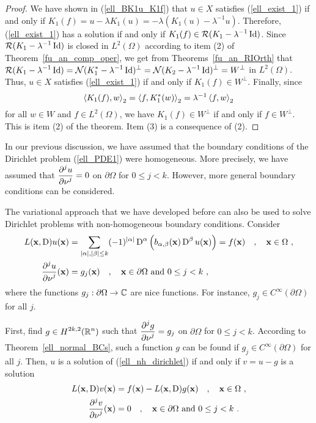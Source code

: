\begin{proof}
We have shown in (\ref{ell_BK1u_K1f}) that $u\in X$ satisfies
(\ref{ell_exist_1}) if and
only if $\displaystyle K_1(f) = u - \lambda K_1(u)
= -\lambda ( K_1(u) - \lambda^{-1} u)$.
Therefore, (\ref{ell_exist_1}) has a solution if and only if
$\displaystyle K_1(f) \in \mathcal{R}(K_1 - \lambda^{-1}\operatorname{Id})$.  Since
$\displaystyle \mathcal{R}(K_1 -\lambda^{-1}\operatorname{Id})$ is closed in
$\displaystyle L^2(\Omega)$ according to
item (2) of Theorem~\ref{fu_an_comp_oper}, we get
from Theorems~\ref{fu_an_RIOrth} that
$\displaystyle \mathcal{R}(K_1-\lambda^{-1}\operatorname{Id}) = \mathcal{N}(K_1^\ast-\lambda^{-1}\operatorname{Id})^\perp
= \mathcal{N}(K_2-\lambda^{-1}\operatorname{Id})^\perp = W^\perp$ in
$\displaystyle L^2(\Omega)$.  Thus, $u\in X$ satisfies
(\ref{ell_exist_1}) if and only if $K_1(f) \in W^\perp$.  Finally,
since
\[
\left\langle{K_1(f)} , {w}\right\rangle_2 = \left\langle{f} , {K_1^\ast(w)}\right\rangle_2 = \lambda^{-1} \left\langle{f} , {w}\right\rangle_2
\]
for all $w \in W$ and $\displaystyle f \in L^2(\Omega)$,
we have $\displaystyle K_1(f) \in W^\perp$ if and only if
$\displaystyle f\in W^\perp$.  This is
item (2) of the theorem.  Item (3) is a consequence of (2).
\end{proof}

\begin{rmk}
In our previous discussion, we have assumed that the boundary
conditions of the Dirichlet problem (\ref{ell_PDE1}) were homogeneous.
More precisely, we have assumed that
$\displaystyle \frac{\displaystyle \partial^{j}{u}} {\displaystyle \partial \mathbf{\nu}^{j}} = 0$ on
$\partial \Omega$ for $0 \leq j < k$.  However, more
general boundary conditions can be considered.   \label{ellRmkNhom}

The variational approach that we have developed before can also be
used to solve Dirichlet problems with non-homogeneous boundary
conditions.  Consider
\begin{equation} \label{ell_nh_dirichlet}
\begin{split}
L(\mathbf{x}, \operatorname{D})u(\mathbf{x})
&= \sum_{|\alpha|,|\beta|\leq k} (-1)^{|\alpha|} \operatorname{D}^\alpha
\left( b_{\alpha,\beta}(\mathbf{x}) \operatorname{D}^\beta u(\mathbf{x})\right) = f(\mathbf{x}) \quad
, \quad \mathbf{x} \in \Omega \ ,\\
\frac{\displaystyle \partial^{j}{u}} {\displaystyle \partial \mathbf{\nu}^{j}}(\mathbf{x}) &= g_j(\mathbf{x}) \quad , \quad
\mathbf{x} \in \partial \Omega \ \text{and}\ 0 \leq j < k \ ,
\end{split}
\end{equation}
where the functions $g_j:\partial \Omega \rightarrow \mathbb{C}$ are nice
functions.  For instance, $g_j \in C^\infty(\partial \Omega)$ for all $j$.

First, find $\displaystyle g\in H^{2k,2}(\mathbb{R}^n)$ such that
$\displaystyle \frac{\displaystyle \partial^{j}{g}} {\displaystyle \partial \mathbf{\nu}^{j}} = g_j$ on $\partial \Omega$ for
$0 \leq j < k$.  According to Theorem~\ref{ell_normal_BCs}, such a
function $g$ can be found if
$\displaystyle g_j \in C^\infty(\partial \Omega)$ for
all $j$.  Then, $u$ is a solution of (\ref{ell_nh_dirichlet}) if and
only if $v=u-g$ is a solution
\begin{align*}
L(\mathbf{x}, \operatorname{D})v(\mathbf{x}) &= f(\mathbf{x}) - L(\mathbf{x},\operatorname{D}) g(\mathbf{x}) \quad
, \quad \mathbf{x} \in \Omega \ ,\\
\frac{\displaystyle \partial^{j}{v}} {\displaystyle \partial \mathbf{\nu}^{j}}(\mathbf{x}) &= 0 \quad , \quad
\mathbf{x} \in \partial \Omega \ \text{and}\ 0 \leq j < k\ .
\end{align*}
\end{rmk}

